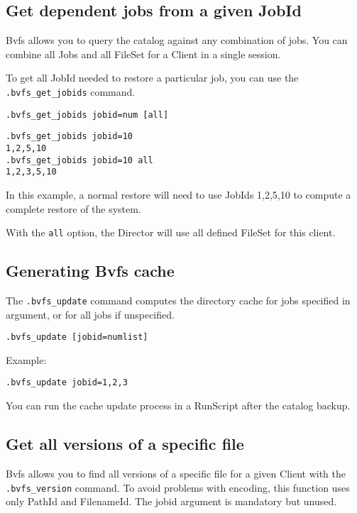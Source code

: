 \subsection*{Get dependent jobs from a given JobId}

Bvfs allows you to query the catalog against any combination of jobs. You
can combine all Jobs and all FileSet for a Client in a single session.

To get all JobId needed to restore a particular job, you can use the
\texttt{.bvfs\_get\_jobids} command.

\begin{verbatim}
.bvfs_get_jobids jobid=num [all]
\end{verbatim}

\begin{verbatim}
.bvfs_get_jobids jobid=10
1,2,5,10
.bvfs_get_jobids jobid=10 all
1,2,3,5,10
\end{verbatim}

In this example, a normal restore will need to use JobIds 1,2,5,10 to
compute a complete restore of the system.

With the \texttt{all} option, the Director will use all defined FileSet for
this client.

\subsection*{Generating Bvfs cache}

The \texttt{.bvfs\_update} command computes the directory cache for jobs
specified in argument, or for all jobs if unspecified.

\begin{verbatim}
.bvfs_update [jobid=numlist]
\end{verbatim}

Example:
\begin{verbatim}
.bvfs_update jobid=1,2,3
\end{verbatim}

You can run the cache update process in a RunScript after the catalog backup.

\subsection*{Get all versions of a specific file}

Bvfs allows you to find all versions of a specific file for a given Client with
the \texttt{.bvfs\_version} command. To avoid problems with encoding, this
function uses only PathId and FilenameId. The jobid argument is mandatory but
unused.


